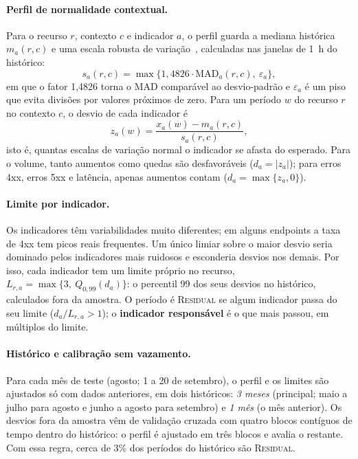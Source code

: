 \documentclass[sigconf,nonacm]{acmart}
\newcommand{\Residual}{\textsc{Residual}\xspace}
\begin{document}
\paragraph{Perfil de normalidade contextual.} Para o recurso $r$, contexto $c$ e indicador $a$, o perfil guarda a mediana histórica $m_a(r,c)$ e uma escala robusta de variação~\citep{leys2013mad}, calculadas nas janelas de 1~h do histórico:
\begin{equation}
  s_{a}(r,c)=\max\{1{,}4826\cdot\mathrm{MAD}_{a}(r,c),\ \varepsilon_a\},
\end{equation}
em que o fator 1,4826 torna o MAD comparável ao desvio-padrão e $\varepsilon_a$ é um piso que evita divisões por valores próximos de zero. Para um período $w$ do recurso $r$ no contexto $c$, o desvio de cada indicador é
\begin{equation}
  z_a(w)=\frac{x_a(w)-m_a(r,c)}{s_a(r,c)},
\end{equation}
isto é, quantas escalas de variação normal o indicador se afasta do esperado. Para o volume, tanto aumentos como quedas são desfavoráveis ($d_a=|z_a|$); para erros 4xx, erros 5xx e latência, apenas aumentos contam ($d_a=\max\{z_a,0\}$).

\paragraph{Limite por indicador.} Os indicadores têm variabilidades muito diferentes; em alguns endpoints a taxa de 4xx tem picos reais frequentes. Um único limiar sobre o maior desvio seria dominado pelos indicadores mais ruidosos e esconderia desvios nos demais. Por isso, cada indicador tem um limite próprio no recurso, $L_{r,a}=\max\{3,\ Q_{0{,}99}(d_a)\}$: o percentil 99 dos seus desvios no histórico, calculados fora da amostra. O período é \Residual se algum indicador passa do seu limite ($d_a/L_{r,a}>1$); o \textbf{indicador responsável} é o que mais passou, em múltiplos do limite.

\paragraph{Histórico e calibração sem vazamento.} Para cada mês de teste (agosto; 1 a 20 de setembro), o perfil e os limites são ajustados só com dados anteriores, em dois históricos: \emph{3 meses} (principal; maio a julho para agosto e junho a agosto para setembro) e \emph{1 mês} (o mês anterior). Os desvios fora da amostra vêm de validação cruzada com quatro blocos contíguos de tempo dentro do histórico: o perfil é ajustado em três blocos e avalia o restante. Com essa regra, cerca de 3\% dos períodos do histórico são \Residual.
\end{document}
